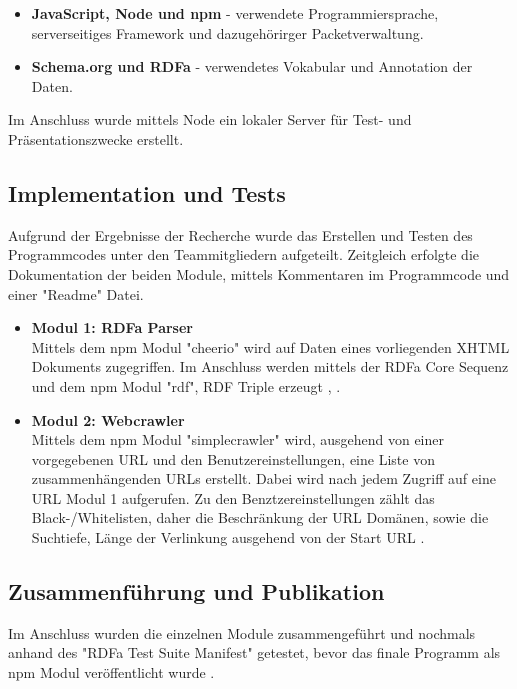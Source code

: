 \documentclass[hidelinks, a4paper, 11pt]{article} %
\begin{document}
\begin{itemize}
\item \textbf{JavaScript, Node und npm} - verwendete Programmiersprache, serverseitiges Framework und dazugeh\"orirger Packetverwaltung.
\item \textbf{Schema.org und RDFa} - verwendetes Vokabular und Annotation der Daten.
\end{itemize}

Im Anschluss wurde mittels Node ein lokaler Server für Test- und Pr\"asentationszwecke erstellt.

\subsection{Implementation und Tests}

Aufgrund der Ergebnisse der Recherche wurde das Erstellen und Testen des Programmcodes unter den Teammitgliedern aufgeteilt. Zeitgleich erfolgte die Dokumentation der beiden Module, mittels Kommentaren im Programmcode und einer "Readme" Datei. 

\begin{itemize}
\item \textbf{Modul 1: RDFa Parser} \\
Mittels dem npm Modul "cheerio" wird auf Daten eines vorliegenden XHTML Dokuments zugegriffen. Im Anschluss werden mittels der RDFa Core Sequenz und dem npm Modul "rdf", RDF Triple erzeugt \cite{cheerioModule}, \cite{rdfModule}. 

\item \textbf{Modul 2: Webcrawler} \\
Mittels dem npm Modul "simplecrawler" wird, ausgehend von einer vorgegebenen URL und den Benutzereinstellungen, eine Liste von zusammenhängenden URLs erstellt. Dabei wird nach jedem Zugriff auf eine URL Modul 1 aufgerufen. Zu den Benztzereinstellungen z\"ahlt das Black-/Whitelisten, daher die Beschränkung der URL Dom\"anen, sowie die Suchtiefe, L\"ange der Verlinkung ausgehend von der Start URL \cite{simplecrawlerModule}.
\end{itemize}

\subsection{Zusammenf\"uhrung und Publikation}

Im Anschluss wurden die einzelnen Module zusammengef\"uhrt und nochmals anhand des "RDFa Test Suite Manifest" getestet, bevor das finale Programm als npm Modul ver\"offentlicht wurde \cite{rdfaTest}.
\end{document}
